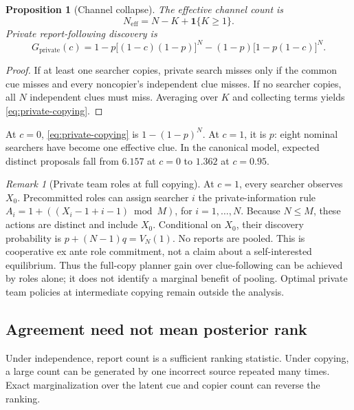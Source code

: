 \documentclass[11pt]{article}
\newtheorem{proposition}{Proposition}
\theoremstyle{definition}
\theoremstyle{remark}
\newtheorem{remark}{Remark}
\newcommand{\1}{\mathbf{1}}
\newcommand{\priv}{\mathrm{private}}
\begin{document}
\begin{proposition}[Channel collapse]
The effective channel count is
\begin{equation}
N_{\mathrm{eff}}=N-K+\1\{K\ge1\}.
\label{eq:effective-channels}
\end{equation}
Private report-following discovery is
\begin{equation}
G_{\priv}(c)
=1-p\bigl[(1-c)(1-p)\bigr]^N
-(1-p)\bigl[1-p(1-c)\bigr]^N.
\label{eq:private-copying}
\end{equation}
\end{proposition}

\begin{proof}
If at least one searcher copies, private search misses only if the common cue misses and every noncopier's independent clue misses. If no searcher copies, all $N$ independent clues must miss. Averaging over $K$ and collecting terms yields \cref{eq:private-copying}.
\end{proof}

At $c=0$, \cref{eq:private-copying} is $1-(1-p)^N$. At $c=1$, it is $p$: eight nominal searchers have become one effective clue. In the canonical model, expected distinct proposals fall from $6.157$ at $c=0$ to $1.362$ at $c=0.95$.

\begin{remark}[Private team roles at full copying]
At $c=1$, every searcher observes $X_0$. Precommitted roles can assign searcher $i$ the private-information rule $A_i=1+((X_i-1+i-1)\bmod M)$, for $i=1,\ldots,N$. Because $N\le M$, these actions are distinct and include $X_0$. Conditional on $X_0$, their discovery probability is $p+(N-1)q=V_N(1)$. No reports are pooled. This is cooperative ex ante role commitment, not a claim about a self-interested equilibrium. Thus the full-copy planner gain over clue-following can be achieved by roles alone; it does not identify a marginal benefit of pooling. Optimal private team policies at intermediate copying remain outside the analysis.
\end{remark}

\subsection{Agreement need not mean posterior rank}

Under independence, report count is a sufficient ranking statistic. Under copying, a large count can be generated by one incorrect source repeated many times. Exact marginalization over the latent cue and copier count can reverse the ranking.
\end{document}
